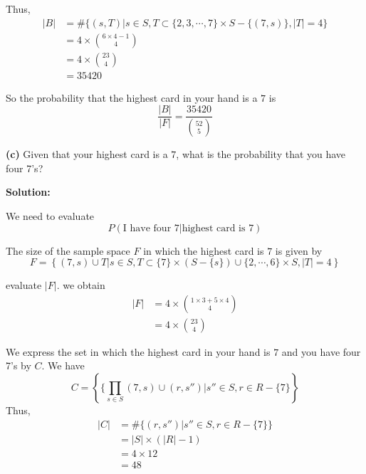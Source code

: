 \documentclass[11pt]{article}
\renewcommand\part[1]{\vspace{.10in}\textbf{(#1)}}
\newcommand{\solution}{\vspace{.10in}\textbf{Solution: }}
\begin{document}
Thus,
\begin{align*}
  |B| &= \#\{(s, T)|s\in S, T\subset \{2,3,\cdots, 7\} \times S - \{(7,s)\}, |T| = 4\}\\
      &= 4\times \binom{6\times4-1}{4}\\
      &= 4\times \binom{23}{4} \\ 
      &= 35420
\end{align*}

So the probability that the highest card in your hand is a $7$ is
\begin{equation*}
  \frac{|B|}{|F|} = \frac{35420}{\binom{52}{5}}
\end{equation*}

\part{c} Given that your highest card is a $7$, what is the probability that you have four 7's?

\solution

We need to evaluate
\begin{equation*}
  P(\text{I have four 7}|\text{highest card is 7})
\end{equation*}

The size of the sample space $F$ in which the highest card is $7$ is given by
\begin{equation*}
  F = \left\{ (7, s)\cup T | s\in S, T\subset\{7\}\times (S-\{s\}) \cup \{2,\cdots,6\} \times S, |T|=4 \right\}
\end{equation*}

evaluate $|F|$. we obtain
\begin{align*}
  |F| &= 4 \times \binom{1\times 3 + 5\times 4}{4}\\
      &= 4 \times \binom{23}{4} 
\end{align*}

We express the set in which the highest card in your hand is $7$ and you have four 7's by $C$. We have
\begin{equation*}
  C = \left\{\{\prod_{s\in S} (7,s)\cup (r,s'')|s''\in S, r\in R-\{7\} \right\}
\end{equation*}
Thus, 
\begin{align*}
  |C| &= \#\{(r,s'')|s''\in S, r\in R-\{7\} \}\\
      &= |S|\times (|R| - 1) \\
      &= 4 \times 12 \\
      &= 48
\end{align*}
\end{document}
